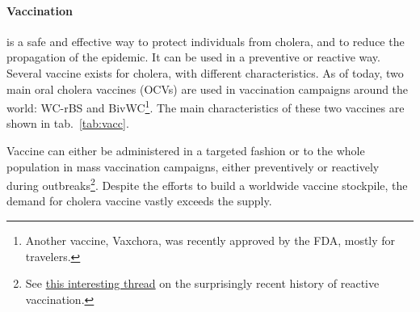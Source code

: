 \paragraph{Vaccination} is a safe and effective way to protect individuals from cholera, and to reduce the propagation of the epidemic. It can be used in a preventive or reactive way. Several vaccine exists for cholera, with different characteristics. As of today, two main oral cholera vaccines (OCVs) are used in vaccination campaigns around the world: WC-rBS and BivWC\footnote[][-3\baselineskip]{Another vaccine, Vaxchora, was recently approved by the FDA, mostly for travelers.}. The main characteristics of these two vaccines are shown in tab.~\ref{tab:vacc}.

 Vaccine can either be administered in a targeted fashion or to the whole population in mass vaccination campaigns, either preventively or reactively during outbreaks\footnote[][-5.5\baselineskip]{See \href{twitter.com/TheFerrariLab/status/1340681737316294659}{this interesting thread} on the surprisingly recent history of reactive vaccination.}. Despite the efforts to build a worldwide vaccine stockpile, the demand for cholera vaccine vastly exceeds the supply\cite[-5\baselineskip]{Parker:AdaptingGlobalShortage:2017a,Seidlein:PreventingCholeraOutbreaks:2018}.
 
